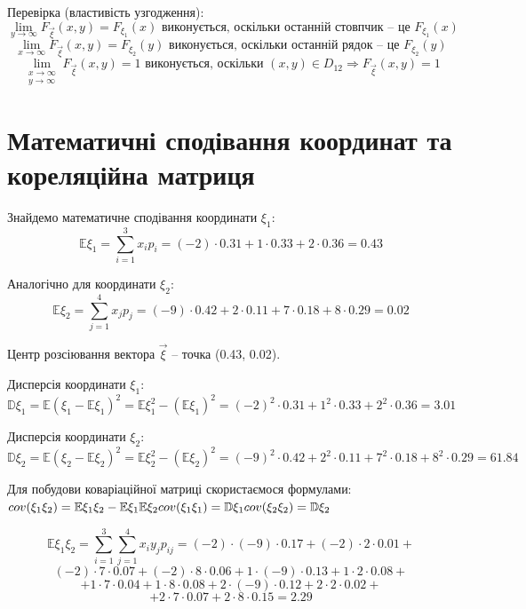 \documentclass[14pt, a4paper, ukrainian]{extreport}
\begin{document}
	Перевірка (властивість узгодження):\\
	$$ \lim\limits_{y \to \infty} F_{\vec \xi} (x,y) = F_{\xi_1} (x) \text{ виконується, оскільки останній стовпчик -- це } F_{\xi_1} (x)$$
	 $$\lim\limits_{x \to \infty} F_{\vec \xi} (x,y) = F_{\xi_2} (y) \text{ виконується, оскільки останній рядок -- це } F_{\xi_2} (y)$$
	 $$\lim\limits_{
		\begin{gathered}
			x \to \infty\\
			y \to \infty
		\end{gathered}
		} 
		F_{\vec \xi} (x,y) = 1  \text{ виконується, оскільки } (x, y) \in D_{12} \Rightarrow F_{\vec \xi} (x, y) = 1 $$
	
	\section{Математичні сподівання координат та кореляційна матриця}
	
	Знайдемо математичне сподівання координати $\xi_1$:
	$$ \mathbb{E}\xi_1 = \sum_{i=1}^{3} x_ip_i = (-2) \cdot 0.31 + 1 \cdot 0.33 + 2 \cdot 0.36 = 0.43 $$
	
	Аналогічно для координати $\xi_2$:
	$$ \mathbb{E}\xi_2 = \sum_{j=1}^{4} x_jp_j = (-9) \cdot 0.42 + 2 \cdot 0.11 + 7 \cdot 0.18 + 8 \cdot 0.29 = 0.02$$
	
	Центр розсіювання вектора $\vec \xi$ -- точка (0.43, 0.02).
	
	Дисперсія координати $\xi_1$:
	$$ \mathbb{D}\xi_1 = \mathbb{E}({\xi_1 - \mathbb{E}\xi_1})^2 = \mathbb{E}\xi_1^2 - (\mathbb{E}\xi_1)^2 = (-2)^2 \cdot 0.31 + 1^2 \cdot 0.33 + 2^2 \cdot 0.36 = 3.01 $$
	
	Дисперсія координати $\xi_2$:	
	$$\mathbb{D}\xi_2 = \mathbb{E}({\xi_2 - \mathbb{E}\xi_2})^2 = \mathbb{E}\xi_2^2 - (\mathbb{E}\xi_2)^2 =		
		(-9)^2 \cdot 0.42 + 2^2 \cdot 0.11 + 7^2 \cdot 0.18 + 8^2 \cdot 0.29 = 61.84	$$
			
	Для побудови коваріаційної матриці скористаємося формулами:\\
		$cov(\xi_1\xi_2) = \mathbb{E}\xi_1\xi_2 - \mathbb{E}\xi_1\mathbb{E}\xi_2\\
		cov(\xi_1\xi_1) = \mathbb{D}\xi_1\\
		cov(\xi_2\xi_2) = \mathbb{D}\xi_2$
		
	$$\mathbb{E}\xi_1\xi_2 = \sum_{i=1}^{3}\sum_{j=1}^{4}x_iy_jp_{ij} = (-2)\cdot(-9)\cdot0.17 + (-2)\cdot2\cdot0.01 + $$
	$$ (-2)\cdot7\cdot0.07 + (-2)\cdot8\cdot0.06 + 1\cdot(-9)\cdot0.13 + 1\cdot2\cdot0.08 +$$
	$$ + 1\cdot7\cdot0.04 + 1\cdot8\cdot0.08 + 2\cdot(-9)\cdot0.12 + 2\cdot2\cdot0.02 + $$
	$$ +2\cdot7\cdot0.07 + 2\cdot8\cdot0.15 = 2.29$$
	
\end{document}
